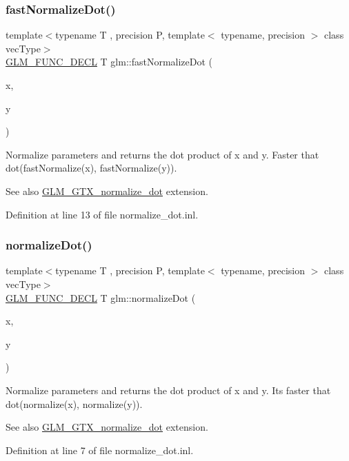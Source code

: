 \subsubsection{\texorpdfstring{fastNormalizeDot()}{fastNormalizeDot()}}
{\footnotesize\ttfamily template$<$typename T , precision P, template$<$ typename, precision $>$ class vec\+Type$>$ \\
\mbox{\hyperlink{setup_8hpp_ab2d052de21a70539923e9bcbf6e83a51}{G\+L\+M\+\_\+\+F\+U\+N\+C\+\_\+\+D\+E\+CL}} T glm\+::fast\+Normalize\+Dot (\begin{DoxyParamCaption}\item[{vec\+Type$<$ T, P $>$ const \&}]{x,  }\item[{vec\+Type$<$ T, P $>$ const \&}]{y }\end{DoxyParamCaption})}

Normalize parameters and returns the dot product of x and y. Faster that dot(fast\+Normalize(x), fast\+Normalize(y)).

\begin{DoxySeeAlso}{See also}
\mbox{\hyperlink{group__gtx__normalize__dot}{G\+L\+M\+\_\+\+G\+T\+X\+\_\+normalize\+\_\+dot}} extension. 
\end{DoxySeeAlso}


Definition at line 13 of file normalize\+\_\+dot.\+inl.

\mbox{\label{group__gtx__normalize__dot_gaffbc2f2cb15838de8886a68048f9004d}} 
\subsubsection{\texorpdfstring{normalizeDot()}{normalizeDot()}}
{\footnotesize\ttfamily template$<$typename T , precision P, template$<$ typename, precision $>$ class vec\+Type$>$ \\
\mbox{\hyperlink{setup_8hpp_ab2d052de21a70539923e9bcbf6e83a51}{G\+L\+M\+\_\+\+F\+U\+N\+C\+\_\+\+D\+E\+CL}} T glm\+::normalize\+Dot (\begin{DoxyParamCaption}\item[{vec\+Type$<$ T, P $>$ const \&}]{x,  }\item[{vec\+Type$<$ T, P $>$ const \&}]{y }\end{DoxyParamCaption})}

Normalize parameters and returns the dot product of x and y. It\textquotesingle{}s faster that dot(normalize(x), normalize(y)).

\begin{DoxySeeAlso}{See also}
\mbox{\hyperlink{group__gtx__normalize__dot}{G\+L\+M\+\_\+\+G\+T\+X\+\_\+normalize\+\_\+dot}} extension. 
\end{DoxySeeAlso}


Definition at line 7 of file normalize\+\_\+dot.\+inl.

